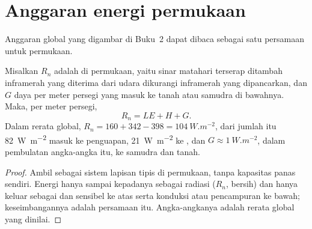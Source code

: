 \section{Anggaran energi permukaan}\label{sec:b1:radiation-heat-transport:surface}

Anggaran global yang digambar di Buku~2 dapat dibaca sebagai satu persamaan untuk permukaan.

\begin{proposition}\label{prop:b1:radiation-heat-transport:surface}
Misalkan $R_n$ adalah  di permukaan, yaitu sinar matahari terserap ditambah inframerah yang diterima dari udara dikurangi inframerah yang dipancarkan, dan $G$ daya per meter persegi yang masuk ke tanah atau samudra di bawahnya. Maka, per meter persegi,
\[
  R_n = LE + H + G .
\]
Dalam rerata global, $R_n = 160 + 342 - 398 = \qty{104}{W.m^{-2}}$, dari jumlah itu
\qty{82}{W.m^{-2}} masuk ke penguapan, \qty{21}{W.m^{-2}} ke , dan $G \approx \qty{1}{W.m^{-2}}$, dalam pembulatan angka-angka itu, ke samudra dan tanah.
\end{proposition}

\begin{proof}
Ambil sebagai sistem lapisan tipis di permukaan, tanpa kapasitas panas sendiri. Energi hanya sampai kepadanya sebagai radiasi ($R_n$, bersih) dan hanya keluar sebagai  dan sensibel ke atas serta konduksi atau pencampuran ke bawah; keseimbangannya adalah persamaan itu. Angka-angkanya adalah rerata global yang dinilai.
\end{proof}


